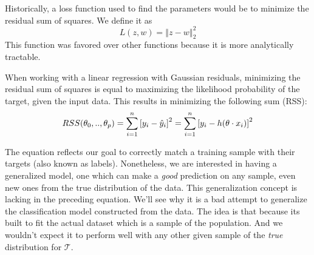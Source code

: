 Historically, a loss function used to find the parameters would be to minimize the residual sum of squares.
We define it as $$L(z,w) = \left\Vert z-w \right\Vert^2_2$$
This function was favored over other functions because it is more analytically tractable.

When working with a linear regression with Gaussian residuals, minimizing the residual sum of squares is equal to maximizing the likelihood probability of the target, given the input data.
This results in minimizing the following sum (RSS):
\begin{equation}
RSS(\theta_0,..,\theta_p) = \sum_{i=1}^n {[y_i - \hat{y}_i ] }^2 \\
= \sum_{i=1}^n  {[y_i - h( \theta \cdot x_i)] }^2
\label{eq:rss}
\end{equation}

The equation reflects our goal to correctly match a training sample with their targets (also known as labels).
Nonetheless, we are interested in having a generalized model, one which can make a \textit{good} prediction on any sample, even new ones from the true distribution of the data.
This generalization concept is lacking in the preceding equation.
We'll see why it is a bad attempt to generalize the classification model constructed from the data.
The idea is that because its built to fit the actual dataset which is a sample of the population.
And we wouldn't expect it to perform well with any other given sample of the \textit{true} distribution for $\mathcal{T}$.
